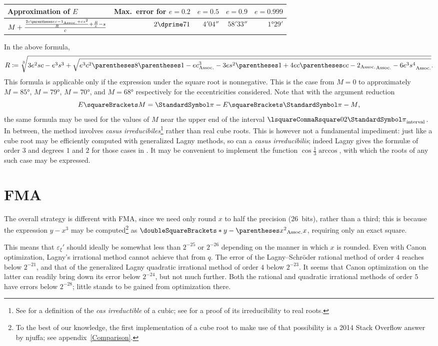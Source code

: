 ﻿\documentclass[10pt, a4paper, twoside]{basestyle}
\newcommand{\round}[1]{\doubleSquareBrackets*{#1}}
\begin{document}
\begin{center}
\begin{tabular}{lrrrr}
Approximation of $E$ & Max.~error for $e=0.2$ & $e=0.5$ & $e=0.9$ & $e=0.999$ \\
\hline
$M+\frac{\frac{2c\pa{ec-1}+es^2}{R}+\frac{R}{e}-s}{c}$
 & $2\dprime\llap.71$ & $4'04\dprime$ & $58'33\dprime$& $1°29'$
\end{tabular}
\end{center}
In the above formula,\[
R\DefineAs\sqrt[3]{3e^2sc-e^3s^3+\sqrt{e^3c^2\pa{8\pa{1-ec}^3-3es^2\pa{1+4ec\pa{ec-2}}-6e^3s^4}}}\text.
\]
This formula is applicable only if the expression under the square root is nonnegative.
This is the case from $M=0$ to approximately $M=85°$, $M=79°$, $M=70°$, and $M=68°$
respectively for the eccentricities considered. Note that with the argument reduction\[
E\of{M}=\Pi-E\of{\Pi-M}\text,\]
the same formula may be used for the values of $M$ near the upper end of the interval $\intclos{0}{2\Pi}$.
In between, the method involves 
\emph{casus irreducibiles}\footnote{See \cite[469]{FantetdeLagny1697} for a definition
of the \emph{cas irreductible} of a cubic; see \cite[125\psqq]{Wantzel1843} for a proof of its irreducibility to real
roots.} rather than real cube roots.
This is however not a fundamental impediment: just like a cube root may be efficiently computed with generalized Lagny
methods, so can a \emph{casus irreducibilis}; indeed Lagny gives the formulæ of order $3$ and degrees $1$ and $2$ for those
cases in \cite[41]{FantetdeLagny1692}. It may be convenient to implement the function
$\cos\frac{1}{3}\arccos$, with which the roots of any such case may be expressed.

\section{FMA}
\label{FMA}
The overall strategy is different with FMA, since we need only round $x$ to half the precision ($26$~bits),
rather than a third; this is because the expression $y-x^3$ may be computed\footnote{To the best of our knowledge,
the first implementation of a cube root to make use of that possibility is a 2014 Stack Overflow answer by njuffa; see
\cbstart{}appendix~\ref{Comparison}.\cbend{}}
as $\round{y-\pa{x^2}x}$, requiring only an exact square.

This means that $ε_ξ'$ should ideally be somewhat less than $2^{-25}$ or $2^{-26}$ depending on
the manner in which $x$ is rounded. Even with Canon optimization, Lagny's irrational method cannot
achieve that from $q$. The error of the Lagny--Schröder rational method of order $4$ reaches\cbdelete{} below $2^{-21}$,
and that of the generalized Lagny quadratic irrational method of order $4$ below $2^{-23}$.
It seems that Canon optimization on the latter can readily bring down its error below $2^{-24}$, but not much
further.
Both the rational and quadratic irrational methods of order $5$ have errors below $2^{-28}$; little stands to be gained
from optimization there.
\end{document}
